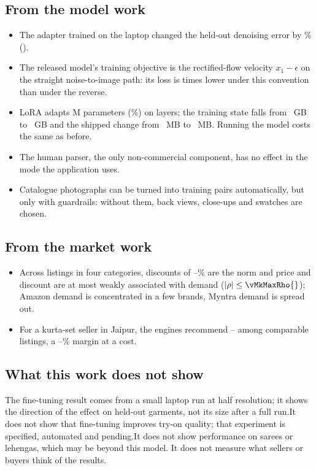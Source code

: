 \subsection{From the model work}
\begin{itemize}
\ifLora\item The adapter trained on the laptop changed the held-out denoising error by \vLcDlRel{}\% (\vLcDlVerdict{}).\fi
\item The released model's training objective is the rectified-flow velocity $x_1 - \epsilon$ on the straight noise-to-image path: its loss is \vLossRatio{} times lower under this convention than under the reverse.
\item LoRA adapts \vTrainParamsM{}M parameters (\vLoraPct{}\%) on \vLoraLayers{} layers; the training state falls from \vFullStateGb{}~GB to \vLoraStateGb{}~GB and the shipped change from \vBaseMb{}~MB to \vAdapterMb{}~MB. Running the model costs the same as before.
\item The human parser, the only non-commercial component, has no effect in the mode the application uses.
\item Catalogue photographs can be turned into training pairs automatically, but only with guardrails: without them, back views, close-ups and swatches are chosen.
\end{itemize}

\subsection{From the market work}
\begin{itemize}
\item Across \vMkTotalClean{} listings in four categories, discounts of \vMkTeeDisc{}--\vMkKurtaDisc{}\% are the norm and price and discount are at most weakly associated with demand ($|\rho| \le \vMkMaxRho{}$); Amazon demand is concentrated in a few brands, Myntra demand is spread out.
\item For a kurta-set seller in Jaipur, the engines recommend \rupee\vExBandLo{}--\rupee\vExBandHi{} among \vExComparables{} comparable listings, a \vExMarginLo{}--\vExMarginHi{}\% margin at a \rupee\vExCost{} cost.
\end{itemize}

\subsection{What this work does not show}
\ifLora The fine-tuning result comes from a small laptop run at half resolution; it shows the direction of the effect on held-out garments, not its size after a full run.\else It does not show that fine-tuning improves try-on quality; that experiment is specified, automated and pending.\fi It does not show performance on sarees or lehengas, which may be beyond this model. It does not measure what sellers or buyers think of the results.

